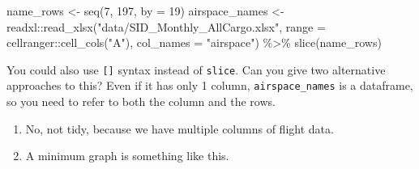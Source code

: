 \documentclass[
]{book}
\newenvironment{Shaded}{\begin{snugshade}}{\end{snugshade}}
\newcommand{\AttributeTok}[1]{\textcolor[rgb]{0.77,0.63,0.00}{#1}}
\newcommand{\CommentTok}[1]{\textcolor[rgb]{0.56,0.35,0.01}{\textit{#1}}}
\newcommand{\DecValTok}[1]{\textcolor[rgb]{0.00,0.00,0.81}{#1}}
\newcommand{\FunctionTok}[1]{\textcolor[rgb]{0.00,0.00,0.00}{#1}}
\newcommand{\NormalTok}[1]{#1}
\newcommand{\OtherTok}[1]{\textcolor[rgb]{0.56,0.35,0.01}{#1}}
\newcommand{\SpecialCharTok}[1]{\textcolor[rgb]{0.00,0.00,0.00}{#1}}
\newcommand{\StringTok}[1]{\textcolor[rgb]{0.31,0.60,0.02}{#1}}
\providecommand{\tightlist}{%
  \setlength{\itemsep}{0pt}\setlength{\parskip}{0pt}}
\begin{document}
\begin{Shaded}
\begin{Highlighting}[]
\NormalTok{name\_rows }\OtherTok{\textless{}{-}} \FunctionTok{seq}\NormalTok{(}\DecValTok{7}\NormalTok{, }\DecValTok{197}\NormalTok{, }\AttributeTok{by =} \DecValTok{19}\NormalTok{)}
\NormalTok{airspace\_names }\OtherTok{\textless{}{-}}\NormalTok{ readxl}\SpecialCharTok{::}\FunctionTok{read\_xlsx}\NormalTok{(}\StringTok{"data/SID\_Monthly\_AllCargo.xlsx"}\NormalTok{, }
                            \AttributeTok{range =}\NormalTok{ cellranger}\SpecialCharTok{::}\FunctionTok{cell\_cols}\NormalTok{(}\StringTok{"A"}\NormalTok{), }
                                      \AttributeTok{col\_names =} \StringTok{"airspace"}\NormalTok{) }\SpecialCharTok{\%\textgreater{}\%} 
  \FunctionTok{slice}\NormalTok{(name\_rows)}
\end{Highlighting}
\end{Shaded}

You could also use \texttt{{[}{]}} syntax instead of \texttt{slice}. Can you give two alternative approaches to this? Even if it has only 1 column, \texttt{airspace\_names} is a dataframe, so you need to refer to both the column and the rows.

\begin{Shaded}
\end{Shaded}

\begin{enumerate}
\def\labelenumi{\arabic{enumi})}
\setcounter{enumi}{2}
\tightlist
\item
  No, not tidy, because we have multiple columns of flight data.
\item
  A minimum graph is something like this.
\end{enumerate}
\end{document}

